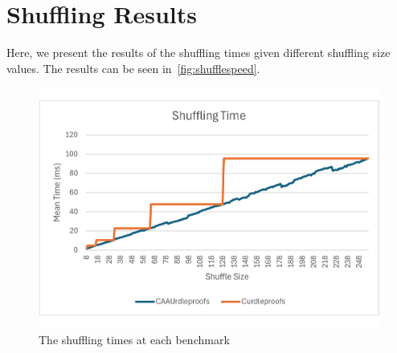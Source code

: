 \clearpage
\section{Shuffling Results}\label{sec:shuffling-results}
Here, we present the results of the shuffling times given different shuffling size values.
The results can be seen in~\autoref{fig:shufflespeed}.
\begin{figure}[!htb]
    \includegraphics[width=0.99\columnwidth]{figures/results/shufflingtime}
    \caption{The shuffling times at each benchmark}%
    \label{fig:shufflespeed}%
\end{figure}
